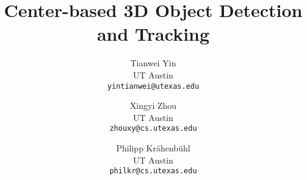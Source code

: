 \documentclass[final]{cvpr}
\begin{document}
\title{Center-based 3D Object Detection and Tracking}

\newcommand{\pk}[1]{\textcolor{brown}{[PHILIPP: #1 ]}}
\newcommand{\Xingyi}[1]{\textcolor{cyan}{[Xingyi: #1 ]}}
\newcommand{\Tianwei}[1]{\textcolor{green}{[Tianwei: #1 ]}}

\newcommand{\comment}[1]{}
\newcommand{\todo}[1]{\textcolor{blue}{[TODO: #1 ]}}
\renewcommand\vec{\mathbf}

\newcommand{\lblsec}[1]{\label{sec:#1}}
\newcommand{\lblfig}[1]{\label{fig:#1}} 
\newcommand{\lbltab}[1]{\label{tbl:#1}}
\newcommand{\lbltbl}[1]{\label{tbl:#1}}
\newcommand{\lbleq}[1]{\label{eq:#1}}
\newcommand{\refsec}[1]{Section~\ref{sec:#1}}
\newcommand{\reffig}[1]{Figure~\ref{fig:#1}} 
\newcommand{\reftab}[1]{Table~\ref{tbl:#1}}
\newcommand{\reftbl}[1]{Table~\ref{tbl:#1}}
\newcommand{\refeq}[1]{Equation~\eqref{eq:#1}}
\newcommand{\refthm}[1]{Theorem~\ref{#1}}
\newcommand{\refprg}[1]{Program~\ref{#1}}
\newcommand{\refalg}[1]{Algorithm~\ref{#1}}
\newcommand{\refclm}[1]{Claim~\ref{#1}}
\newcommand{\reflem}[1]{Lemma~\ref{#1}}
\newcommand{\refpty}[1]{Property~\ref{#1}}
\newcommand{\refop}[1]{OP-\ref{op:#1}}
\newcommand{\pb}{center-based }

\author{Tianwei Yin\\
UT Austin \\ 
{\tt\small yintianwei@utexas.edu}
\and
Xingyi Zhou\\
UT Austin \\ 
{\tt\small zhouxy@cs.utexas.edu}
\and 
Philipp Kr\"ahenb\"uhl \\
UT Austin \\ 
{\tt\small philkr@cs.utexas.edu}

}

\maketitle
\end{document}
